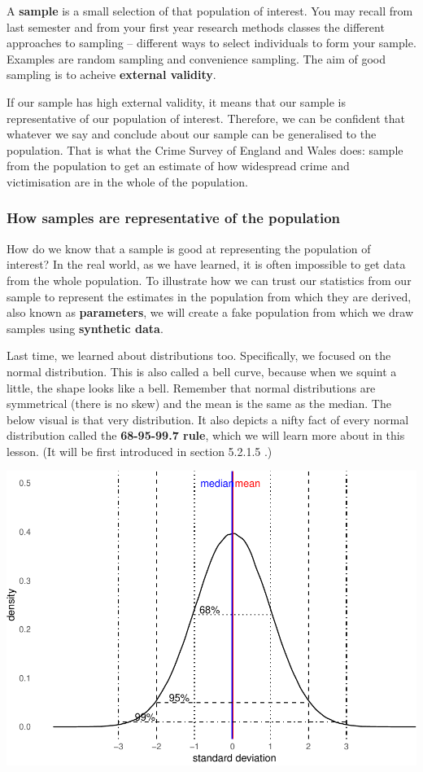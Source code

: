 \documentclass[
]{book}
\begin{document}
A \textbf{sample} is a small selection of that population of interest. You may recall from last semester and from your first year research methods classes the different approaches to sampling -- different ways to select individuals to form your sample. Examples are random sampling and convenience sampling. The aim of good sampling is to acheive \textbf{external validity}.

If our sample has high external validity, it means that our sample is representative of our population of interest. Therefore, we can be confident that whatever we say and conclude about our sample can be generalised to the population. That is what the Crime Survey of England and Wales does: sample from the population to get an estimate of how widespread crime and victimisation are in the whole of the population.

\hypertarget{how-samples-are-representative-of-the-population}{%
\subsubsection{How samples are representative of the population}\label{how-samples-are-representative-of-the-population}}

How do we know that a sample is good at representing the population of interest? In the real world, as we have learned, it is often impossible to get data from the whole population. To illustrate how we can trust our statistics from our sample to represent the estimates in the population from which they are derived, also known as \textbf{parameters}, we will create a fake population from which we draw samples using \textbf{synthetic data}.

Last time, we learned about distributions too. Specifically, we focused on the normal distribution. This is also called a bell curve, because when we squint a little, the shape looks like a bell. Remember that normal distributions are symmetrical (there is no skew) and the mean is the same as the median. The below visual is that very distribution. It also depicts a nifty fact of every normal distribution called the \textbf{68-95-99.7 rule}, which we will learn more about in this lesson. (It will be first introduced in section 5.2.1.5 .)

\includegraphics{05-inferential-statistics_files/figure-latex/unnamed-chunk-2-1.pdf}
\end{document}
